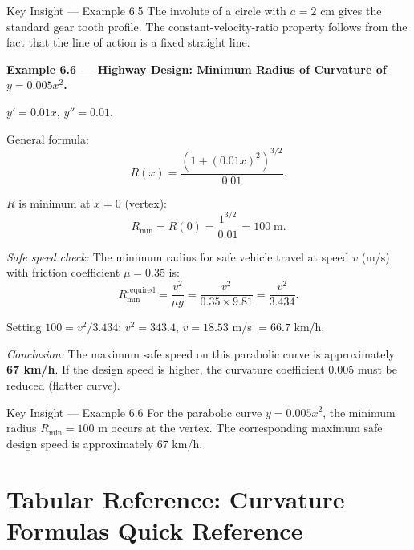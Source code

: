 \documentclass[12pt,a4paper]{article}
\begin{document}
\begin{learnbox}{Key Insight --- Example 6.5}
The involute of a circle with $a=2$ cm gives the standard gear tooth profile. The constant-velocity-ratio property follows from the fact that the line of action is a fixed straight line.
\end{learnbox}

\bigskip
\textbf{Example 6.6 --- Highway Design: Minimum Radius of Curvature of $y = 0.005x^{2}$.}

$y' = 0.01x$, $y'' = 0.01$.

General formula:
\[
  R(x) = \frac{(1+(0.01x)^{2})^{3/2}}{0.01}.
\]

$R$ is minimum at $x=0$ (vertex):
\[
  R_{\min} = R(0) = \frac{1^{3/2}}{0.01} = 100\;\text{m}.
\]

\textit{Safe speed check:} The minimum radius for safe vehicle travel at speed $v$ (m/s) with friction coefficient $\mu = 0.35$ is:
\[
  R_{\min}^{\text{required}} = \frac{v^{2}}{\mu g} = \frac{v^{2}}{0.35\times 9.81} = \frac{v^{2}}{3.434}.
\]

Setting $100 = v^{2}/3.434$: $v^{2} = 343.4$, $v = 18.53$ m/s $= 66.7$ km/h.

\textit{Conclusion:} The maximum safe speed on this parabolic curve is approximately \textbf{67 km/h}. If the design speed is higher, the curvature coefficient $0.005$ must be reduced (flatter curve).

\begin{learnbox}{Key Insight --- Example 6.6}
For the parabolic curve $y=0.005x^2$, the minimum radius $R_{\min}=100$ m occurs at the vertex. The corresponding maximum safe design speed is approximately 67 km/h.
\end{learnbox}

\section{Tabular Reference: Curvature Formulas Quick Reference}
\end{document}
